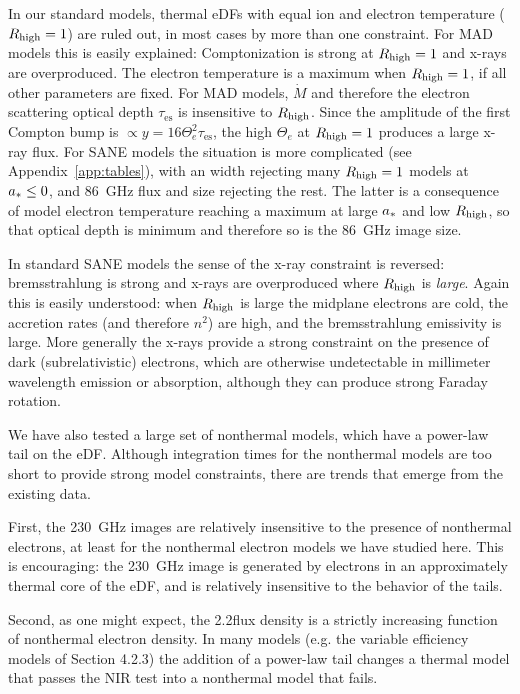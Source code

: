 In our standard models, thermal eDFs with equal ion and electron temperature ($R_\mathrm{high} = 1$) are ruled out, in most cases by more than one constraint.  For MAD models this is easily explained: Comptonization is strong at $R_\mathrm{high} = 1$ and x-rays are overproduced.  The electron temperature is a maximum when $R_\mathrm{high} = 1$, if all other parameters are fixed. For MAD models, $\dot{M}$ and therefore the electron scattering optical depth $\tau_\mathrm{es}$ is insensitive to $R_\mathrm{high}$.  Since the amplitude of the first Compton bump is $\propto y = 16 \Theta_e^2 \tau_\mathrm{es}$, the high $\Theta_e$ at $R_\mathrm{high} = 1$ produces a large x-ray flux.  For SANE models the situation is more complicated (see Appendix~\ref{app:tables}), with an \mring width rejecting many $R_\mathrm{high} = 1$ models at $a_* \le 0$, and 86~GHz flux and size rejecting the rest.  The latter is a consequence of model electron temperature reaching a maximum at large $a_*$ and low $R_\mathrm{high}$, so that optical depth is minimum and therefore so is the 86~GHz image size.

In standard SANE models the sense of the x-ray constraint is reversed: bremsstrahlung is strong and x-rays are overproduced where $R_\mathrm{high}$ is {\em large}.  Again this is easily understood: when $R_\mathrm{high}$ is large the midplane electrons are cold, the accretion rates (and therefore $n^2$) are high, and the bremsstrahlung emissivity is large.  More generally the x-rays provide a strong constraint on the presence of dark (subrelativistic) electrons, which are otherwise undetectable in millimeter wavelength emission or absorption, although they can produce strong Faraday rotation.

We have also tested a large set of nonthermal models, which have a power-law tail on the eDF.  Although integration times for the nonthermal models are too short to provide strong model constraints, there are trends that emerge from the existing data.

First, the 230~GHz images are relatively insensitive to the presence of nonthermal electrons, at least for the nonthermal electron models we have studied here.  This is encouraging: the 230~GHz image is generated by electrons in an approximately thermal core of the eDF, and is relatively insensitive to the behavior of the tails.

Second, as one might expect, the 2.2\um flux density is a strictly increasing function of nonthermal electron density.  In many models (e.g. the variable efficiency models of Section 4.2.3) the addition of a power-law tail changes a thermal model that passes the NIR test into a nonthermal model that fails.


